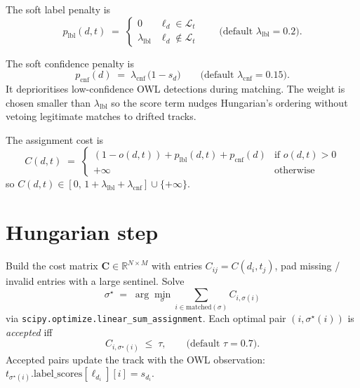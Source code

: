 \documentclass[11pt]{article}
\begin{document}
The soft label penalty is
\begin{equation}
    p_{\text{lbl}}(d, t) \;=\;
    \begin{cases}
        0 & \ell_d \in \mathcal{L}_t \\
        \lambda_{\text{lbl}} & \ell_d \notin \mathcal{L}_t
    \end{cases}
    \qquad \text{(default } \lambda_{\text{lbl}} = 0.2 \text{)}.
\end{equation}

The soft confidence penalty is
\begin{equation}
    p_{\text{cnf}}(d) \;=\; \lambda_{\text{cnf}} \,\bigl(1 - s_d\bigr)
    \qquad \text{(default } \lambda_{\text{cnf}} = 0.15 \text{)}.
\end{equation}
It deprioritises low-confidence OWL detections during matching. The
weight is chosen smaller than $\lambda_{\text{lbl}}$ so the score term
nudges Hungarian's ordering without vetoing legitimate matches to
drifted tracks.

The assignment cost is
\begin{equation}
    \boxed{\;
        C(d, t) \;=\;
        \begin{cases}
            (1 - o(d,t)) + p_{\text{lbl}}(d,t) + p_{\text{cnf}}(d)
                & \text{if } o(d,t) > 0 \\
            +\infty & \text{otherwise}
        \end{cases}
    \;}
\end{equation}
so $C(d,t) \in [0,\,1 + \lambda_{\text{lbl}} + \lambda_{\text{cnf}}]
\cup \{+\infty\}$.

\section*{Hungarian step}
Build the cost matrix $\mathbf{C} \in \mathbb{R}^{N \times M}$ with entries
$C_{ij} = C(d_i, t_j)$, pad missing / invalid entries with a large sentinel.
Solve
\begin{equation}
    \sigma^\star \;=\; \arg\min_{\sigma}
        \sum_{i \in \text{matched}(\sigma)} C_{i,\sigma(i)}
\end{equation}
via \texttt{scipy.optimize.linear\_sum\_assignment}. Each optimal pair
$(i,\sigma^\star(i))$ is \emph{accepted} iff
\begin{equation}
    C_{i,\sigma^\star(i)} \;\le\; \tau, \qquad \text{(default } \tau = 0.7 \text{)}.
\end{equation}
Accepted pairs update the track with the OWL observation:
$t_{\sigma^\star(i)}\text{.label\_scores}[\ell_{d_i}][i] = s_{d_i}$.
\end{document}
